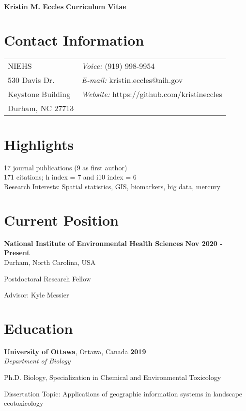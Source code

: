 \documentclass[margin,line]{res}
\newenvironment{list1}{
  \begin{list}{\ding{113}}{%
      \setlength{\itemsep}{0in}
      \setlength{\parsep}{0in} \setlength{\parskip}{0in}
      \setlength{\topsep}{0in} \setlength{\partopsep}{0in}
      \setlength{\leftmargin}{0.17in}}}{\end{list}}
\begin{document}
\begin{flushleft}
		\huge \textbf{Kristin M. Eccles}
		\hfill {\LARGE \textbf{Curriculum Vitae}}\\
\end{flushleft}


\begin{resume}
\section{\sc Contact Information}
\vspace{.05in}
\begin{tabular}{@{}p{2in}p{4in}}
NIEHS          & {\it Voice:}  (919) 998-9954 \\
530 Davis Dr. &   {\it E-mail:}  kristin.eccles@nih.gov\\
Keystone Building  &       {\it Website:} https://github.com/kristineccles\\
Durham, NC 27713

\end{tabular}

\vspace*{.1in}

\section{\sc Highlights}
17 journal publications (9 as first author)
\\
171 citations; h index = 7 and i10 index = 6
\\
Research Interests: Spatial statistics, GIS, biomarkers, big data, mercury

\section{\sc Current  Position}

{\bf  National Institute of Environmental Health Sciences}
\hfill {\bf Nov 2020 - Present}\\
 Durham,  North Carolina, USA

\vspace*{.1in}
\begin{list1}
	\item[] Postdoctoral Research Fellow
	\item[] Advisor: Kyle Messier
\end{list1}

\vspace*{.1in}

\section{\sc Education}
{\bf University of Ottawa}, Ottawa, Canada
 \hfill {\bf 2019}\\
{\em Department of Biology}
\vspace*{.1in}
\begin{list1}
\item[] Ph.D. Biology, Specialization in Chemical and Environmental Toxicology
\vspace*{.05in}
\item[] Dissertation Topic:  Applications of geographic information systems in landscape ecotoxicology


\end{list1}
\end{resume}
\end{document}
